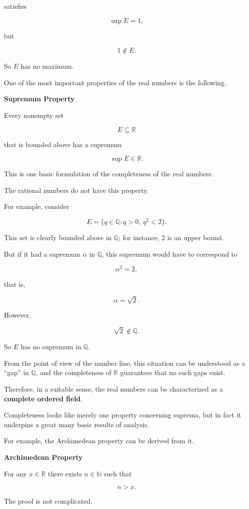 \documentclass[11pt]{article}
\begin{document}
satisfies

\[
\sup E=1,
\]

but

\[
1\notin E.
\]

So $E$ has no maximum.

One of the most important properties of the real numbers is the following.

\textbf{Supremum Property}

Every nonempty set

\[
E\subseteq\mathbb{R}
\]

that is bounded above has a supremum

\[
\sup E\in\mathbb{R}.
\]

This is one basic formulation of the completeness of the real numbers.

The rational numbers do not have this property.

For example, consider

\[
E=\{q\in\mathbb{Q}:q>0,\ q^{2}<2\}.
\]

This set is clearly bounded above in $\mathbb{Q}$; for instance, $2$ is an upper bound.

But if it had a supremum $\alpha$ in $\mathbb{Q}$, this supremum would have to correspond to

\[
\alpha^{2}=2,
\]

that is,

\[
\alpha=\sqrt{2}.
\]

However,

\[
\sqrt{2}\notin\mathbb{Q}.
\]

So $E$ has no supremum in $\mathbb{Q}$.

From the point of view of the number line, this situation can be understood as a ``gap'' in $\mathbb{Q}$, and the completeness of $\mathbb{R}$ guarantees that no such gaps exist.

Therefore, in a suitable sense, the real numbers can be characterized as a \textbf{complete ordered field}.

Completeness looks like merely one property concerning suprema, but in fact it underpins a great many basic results of analysis.

For example, the Archimedean property can be derived from it.

\textbf{Archimedean Property}

For any $x\in\mathbb{R}$ there exists $n\in\mathbb{N}$ such that

\[
n>x.
\]

The proof is not complicated.
\end{document}
